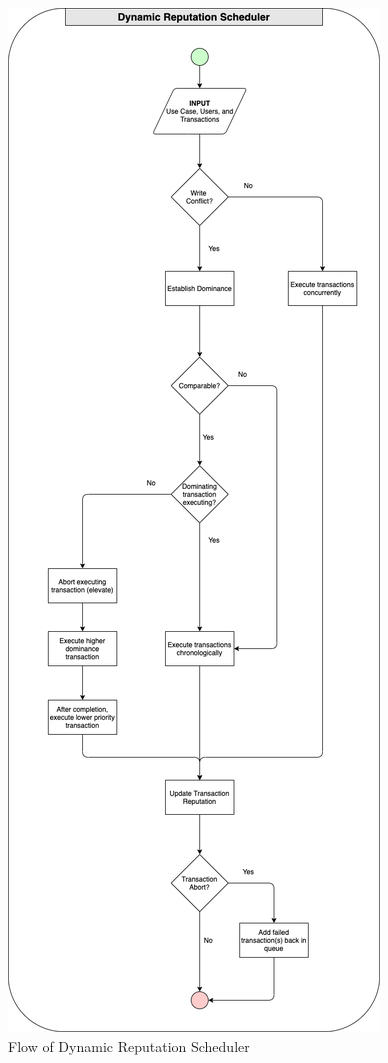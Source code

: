 \begin{figure}
\centering
\includegraphics[scale=0.33]{images/DRPScheduler.png}
\caption{Flow of Dynamic Reputation Scheduler}
\label{image:flow_of_drs}
\end{figure}

